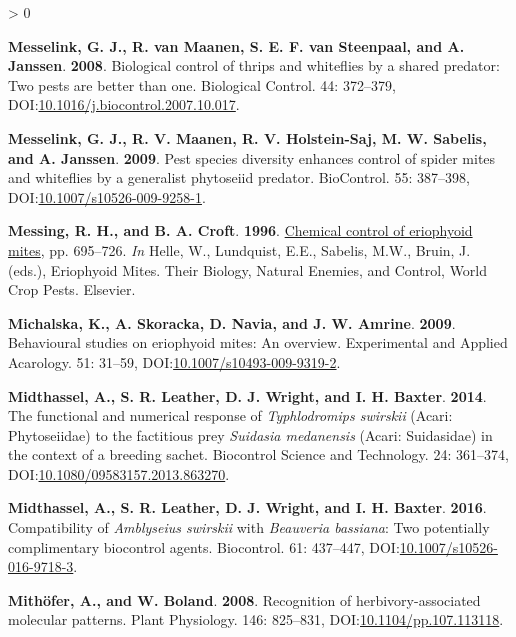 \documentclass{ufdissertation}[overrideChapters] %
\newlength{\cslhangindent}
\newenvironment{CSLReferences}[2] %
 {%
  \setlength{\parindent}{0pt}
  \ifodd #1 \everypar{\setlength{\hangindent}{\cslhangindent}}\ignorespaces\fi
  \ifnum #2 > 0
  \setlength{\parskip}{#2\baselineskip}
  \fi
 }%
 {}
\begin{document}
{\begin{CSLReferences}{1}{1}
\leavevmode{}%
\textbf{Messelink, G. J., R. van Maanen, S. E. F. van Steenpaal, and A. Janssen}. \textbf{2008}. Biological control of thrips and whiteflies by a shared predator: Two pests are better than one. Biological Control. 44: 372--379, DOI:\href{https://doi.org/10.1016/j.biocontrol.2007.10.017}{10.1016/j.biocontrol.2007.10.017}.

\leavevmode{}%
\textbf{Messelink, G. J., R. V. Maanen, R. V. Holstein-Saj, M. W. Sabelis, and A. Janssen}. \textbf{2009}. Pest species diversity enhances control of spider mites and whiteflies by a generalist phytoseiid predator. {BioControl}. 55: 387--398, DOI:\href{https://doi.org/10.1007/s10526-009-9258-1}{10.1007/s10526-009-9258-1}.

\leavevmode{}%
\textbf{Messing, R. H., and B. A. Croft}. \textbf{1996}. \href{https://doi.org/10.1016/s1572-4379(96)80006-6}{Chemical control of eriophyoid mites}, pp. 695--726. \emph{In} Helle, W., Lundquist, E.E., Sabelis, M.W., Bruin, J. (eds.), Eriophyoid Mites. Their Biology, Natural Enemies, and Control, World Crop Pests. Elsevier.

\leavevmode{}%
\textbf{Michalska, K., A. Skoracka, D. Navia, and J. W. Amrine}. \textbf{2009}. Behavioural studies on eriophyoid mites: An overview. Experimental and Applied Acarology. 51: 31--59, DOI:\href{https://doi.org/10.1007/s10493-009-9319-2}{10.1007/s10493-009-9319-2}.

\leavevmode{}%
\textbf{Midthassel, A., S. R. Leather, D. J. Wright, and I. H. Baxter}. \textbf{2014}. The functional and numerical response of {\emph{Typhlodromips swirskii}} ({Acari}: {Phytoseiidae}) to the factitious prey {\emph{Suidasia medanensis}} ({Acari}: {Suidasidae}) in the context of a breeding sachet. Biocontrol Science and Technology. 24: 361--374, DOI:\href{https://doi.org/10.1080/09583157.2013.863270}{10.1080/09583157.2013.863270}.

\leavevmode{}%
\textbf{Midthassel, A., S. R. Leather, D. J. Wright, and I. H. Baxter}. \textbf{2016}. Compatibility of {\emph{Amblyseius swirskii}} with {\emph{Beauveria bassiana}}: Two potentially complimentary biocontrol agents. Biocontrol. 61: 437--447, DOI:\href{https://doi.org/10.1007/s10526-016-9718-3}{10.1007/s10526-016-9718-3}.

\leavevmode{}%
\textbf{Mithöfer, A., and W. Boland}. \textbf{2008}. Recognition of herbivory-associated molecular patterns. Plant Physiology. 146: 825--831, DOI:\href{https://doi.org/10.1104/pp.107.113118}{10.1104/pp.107.113118}.


\end{CSLReferences}}
\end{document}
